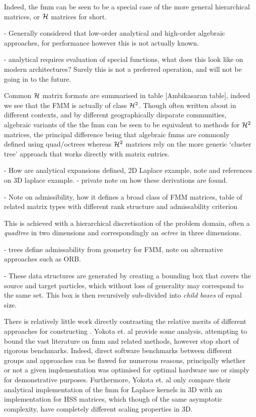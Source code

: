Indeed, the \acrshort{fmm} can be seen to be a special case of the more general hierarchical matrices, or $\mathcal{H}$ matrices for short.

- Generally considered that low-order analytical and high-order algebraic approaches, for performance however this is not actually known.

- analytical requires evaluation of special functions, what does this look like on modern architectures? Surely this is not a preferred operation, and will not be going in to the future.

Common $\mathcal{H}$ matrix formats are summarised in table [Ambikasaran table], indeed we see that the FMM is actually of class $\mathcal{H}^2$. Though often written about in different contexts, and by different geographically disparate communities, algebraic variants of the the \acrshort{fmm} can be seen to be equivalent to methods for $\mathcal{H}^2$ matrices, the principal difference being that algebraic \glspl{fmm} are commonly defined using quad/octrees whereas $\mathcal{H}^2$ matrices rely on the more generic `cluster tree' approach that works directly with matrix entries.

- How are analytical expansions defined, 2D Laplace example, note and references on 3D laplace example.
    - private note on how these derivations are found.

- Note on admissibility, how it defines a broad class of FMM matrices, table of related matrix types with different rank structure and admissability criterion

This is achieved with a hierarchical discretisation of the problem domain, often a \textit{quadtree} in two dimensions and correspondingly an \textit{octree} in three dimensions.

- trees define admissability from geometry for FMM, note on alternative approaches such as ORB.

- These data structures are generated by creating a bounding box that covers the source and target particles, which without loss of generality may correspond to the same set. This box is then recursively sub-divided into \textit{child boxes} of equal size.

There is relatively little work directly contrasting the relative merits of different approaches for constructing . Yokota et. al \cite{yokota2015fast} provide some analysis, attempting to bound the vast literature on \acrshort{fmm} and related methods, however stop short of rigorous benchmarks. Indeed, direct software benchmarks between different groups and approaches can be flawed for numerous reasons, principally whether or not a given implementation was optimised for optimal hardware use or simply for demonstrative purposes. Furthermore, Yokota et. al only compare their analytical implementation of the \acrshort{fmm} for Laplace kernels in 3D with an implementation for HSS matrices, which though of the same asymptotic complexity, have completely different scaling properties in 3D.

